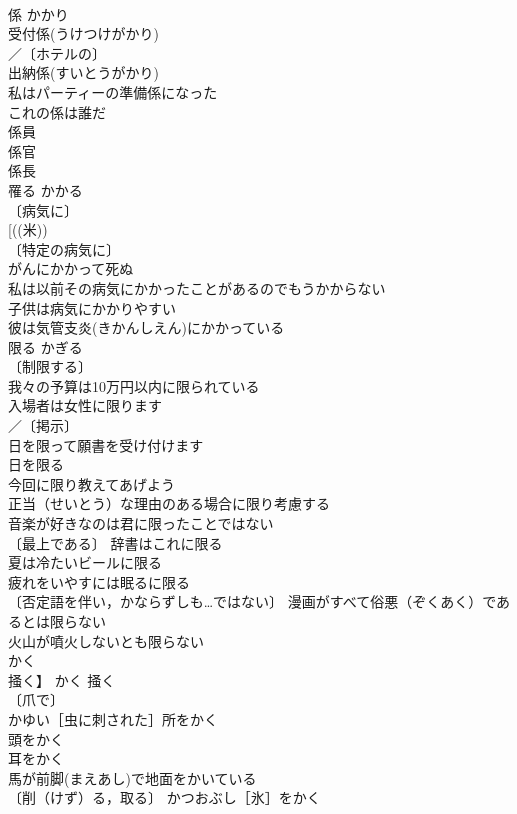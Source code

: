 \documentclass[8pt]{extreport}
\begin{document}
\begin{CJK}{UTF8}{min}
\\	係	かかり	
\\	受付係(うけつけがかり) 
\\	／〔ホテルの〕
\\	出納係(すいとうがかり) 
\\	私はパーティーの準備係になった 
\\	これの係は誰だ 
\\	係員 
\\	係官 
\\	係長 
\\	罹る	かかる	
\\	〔病気に〕
\\	[((米)) 
\\	〔特定の病気に〕
\\	がんにかかって死ぬ 
\\	私は以前その病気にかかったことがあるのでもうかからない 
\\	子供は病気にかかりやすい 
\\	彼は気管支炎(きかんしえん)にかかっている 
\\	限る	かぎる	
\\	〔制限する〕
\\	我々の予算は10万円以内に限られている 
\\	入場者は女性に限ります 
\\	／〔掲示〕
\\	日を限って願書を受け付けます 
\\	日を限る　
\\	今回に限り教えてあげよう 
\\	正当（せいとう）な理由のある場合に限り考慮する 
\\	音楽が好きなのは君に限ったことではない 
\\	〔最上である〕 辞書はこれに限る 
\\	夏は冷たいビールに限る 
\\	疲れをいやすには眠るに限る 
\\	〔否定語を伴い，かならずしも…ではない〕 漫画がすべて俗悪（ぞくあく）であるとは限らない 
\\	火山が噴火しないとも限らない 
\\	かく
\\	掻く】	かく	掻く 
\\	〔爪で〕
\\	かゆい［虫に刺された］所をかく 
\\	頭をかく 
\\	耳をかく 
\\	馬が前脚(まえあし)で地面をかいている 
\\	〔削（けず）る，取る〕 かつおぶし［氷］をかく 

\end{CJK}
\end{document}
